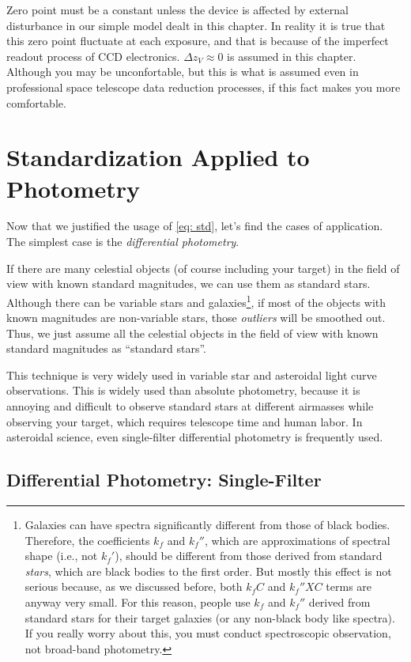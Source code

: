 Zero point must be a constant unless the device is affected by external disturbance in our simple model dealt in this chapter. In reality it is true that this zero point fluctuate at each exposure, and that is because of the imperfect readout process of CCD electronics. $ \Delta z_V \approx 0 $ is assumed in this chapter. Although you may be unconfortable, but this is what is assumed even in professional space telescope data reduction processes, if this fact makes you more comfortable.

\section{Standardization Applied to Photometry}
Now that we justified the usage of \cref{eq: std}, let's find the cases of application. The simplest case is the \textit{differential photometry}. 

If there are many celestial objects (of course including your target) in the field of view with known standard magnitudes, we can use them as standard stars. Although there can be variable stars and galaxies\footnote{Galaxies can have spectra significantly different from those of black bodies. Therefore, the coefficients $ k_f $ and $ k_f'' $, which are approximations of spectral shape (i.e., not $ k_f' $), should be different from those derived from standard \textit{stars}, which are black bodies to the first order. But mostly this effect is not serious because, as we discussed before, both $ k_f C $ and $ k_f'' X C $ terms are anyway very small. For this reason, people use $ k_f $ and $ k_f'' $ derived from standard stars for their target galaxies (or any non-black body like spectra). If you really worry about this, you must conduct spectroscopic observation, not broad-band photometry.}, if most of the objects with known magnitudes are non-variable stars, those \textit{outliers} will be smoothed out. Thus, we just assume all the celestial objects in the field of view with known standard magnitudes as ``standard stars''. 

This technique is very widely used in variable star and asteroidal light curve observations. This is widely used than absolute photometry, because it is annoying and difficult to observe standard stars at different airmasses while observing your target, which requires telescope time and human labor. In asteroidal science, even single-filter differential photometry is frequently used. 

\subsection{Differential Photometry: Single-Filter}

